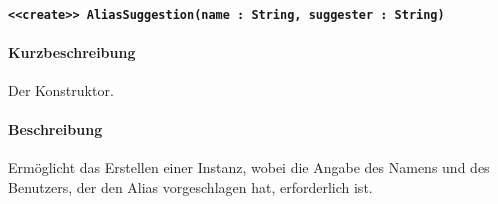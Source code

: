 \paragraph{\texttt{<<create>> AliasSuggestion(name : String, suggester : String)}}%
\paragraph*{Kurzbeschreibung}
Der Konstruktor.
\paragraph*{Beschreibung}
Ermöglicht das Erstellen einer Instanz, wobei die Angabe des Namens und des Benutzers, der den Alias vorgeschlagen hat, erforderlich ist.
